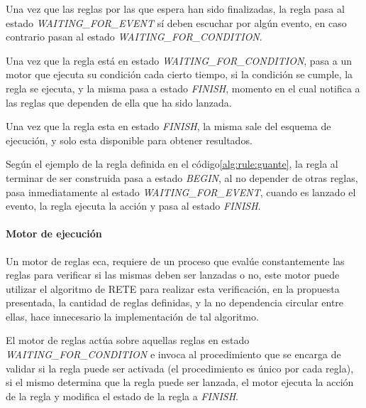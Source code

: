 Una vez que las reglas por las que espera han sido finalizadas, la regla pasa al estado
\emph{WAITING\_FOR\_EVENT} sí deben escuchar por algún evento, en caso contrario
pasan al estado \emph{WAITING\_FOR\_CONDITION}.

Una vez que la regla está en estado \emph{WAITING\_FOR\_CONDITION}, pasa a un
motor que ejecuta su condición cada cierto tiempo, si la condición se cumple, la
regla se ejecuta, y la misma pasa a estado \emph{FINISH}, momento en el cual
notifica a las reglas que dependen de ella que ha sido lanzada.

Una vez que la regla esta en estado \emph{FINISH}, la misma sale del esquema de
ejecución, y solo esta disponible para obtener resultados.

Según el ejemplo de la regla definida en el código\ref{alg:rule:guante}, la
regla al terminar de ser construida pasa a estado \emph{BEGIN}, al no depender
de otras reglas, pasa inmediatamente al estado \emph{WAITING\_FOR\_EVENT},
cuando es lanzado el evento, la regla ejecuta la acción y pasa al estado
\emph{FINISH}.

\paragraph{Motor de ejecución}

Un motor de reglas \gls{eca}, requiere de un proceso que evalúe constantemente
las reglas para verificar si las mismas deben ser lanzadas o
no\cite{bailey2004event,galton2002two}, este motor puede utilizar el algoritmo
de RETE\cite{de2001eca} para realizar esta verificación, en la propuesta
presentada, la cantidad de reglas definidas, y la no dependencia circular entre
ellas, hace innecesario la implementación de tal algoritmo\cite{de2001eca}. 

El motor de reglas actúa sobre aquellas reglas en estado
\emph{WAITING\_FOR\_CONDITION} e invoca al procedimiento que se encarga de
validar si la regla puede ser activada (el procedimiento es único por cada
regla), si el mismo determina que la regla puede ser lanzada, el motor ejecuta
la acción de la regla y modifica el estado de la regla a \emph{FINISH}.



